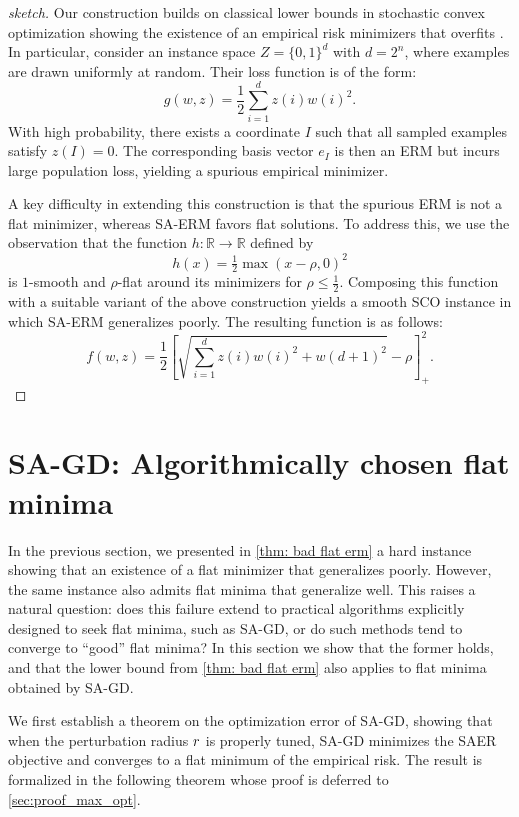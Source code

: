 \begin{proof}[sketch]
Our construction builds on classical lower bounds in stochastic convex optimization showing the existence of an empirical risk minimizers that overfits \citep{shalev2010learnability,feldman2016generalization}. In particular, \citet{shalev2010learnability} consider an instance space $Z = \{0,1\}^{d}$ with $d = 2^n$, where examples are drawn uniformly at random. Their loss function is of the form: 
\[
g(w,z) = \frac{1}{2} \sum_{i=1}^{d} z(i) w(i)^2 .
\]
With high probability, there exists a coordinate $I$ such that all sampled examples satisfy $z(I)=0$. The corresponding basis vector $e_I$ is then an ERM but incurs large population loss, yielding a spurious empirical minimizer.

A key difficulty in extending this construction is that the spurious ERM is not a flat minimizer, whereas SA-ERM favors flat solutions.
To address this, we use the observation that the function $h:\mathbb{R}\to\mathbb{R}$ defined by
\[
h(x) = \tfrac{1}{2}\max(x-\rho,0)^2
\]
is $1$-smooth and $\rho$-flat around its minimizers for $\rho \leq \tfrac{1}{2}$.
Composing this function with a suitable variant of the above construction yields a smooth SCO instance in which SA-ERM generalizes poorly. The resulting function is as follows:
\[
f(w,z) = \frac{1}{2}\left[ \sqrt{\sum_{i=1}^{d} z(i) w(i)^2 + w(d+1)^2} - \rho \right]_+^2 .
\]
\end{proof}




\section{SA-GD: Algorithmically chosen flat minima}\label{sec:sa_gd}
In the previous section, we presented in \cref{thm: bad flat erm} a hard instance showing that an existence of a flat minimizer that generalizes poorly. However, the same instance also admits flat minima that generalize well.
This raises a natural question: does this failure extend to practical algorithms explicitly designed to seek flat minima, such as SA-GD, or do such methods tend to converge to “good” flat minima? In this section we show that the former holds, and that the lower bound from \cref{thm: bad flat erm} also applies to flat minima obtained by SA-GD. 

We first establish a theorem on the optimization error of SA-GD, showing that when the perturbation radius $r$ is properly tuned, SA-GD minimizes the SAER objective and converges to a flat minimum of the empirical risk. 
The result is formalized in the following theorem whose proof is deferred to \cref{sec:proof_max_opt}.

